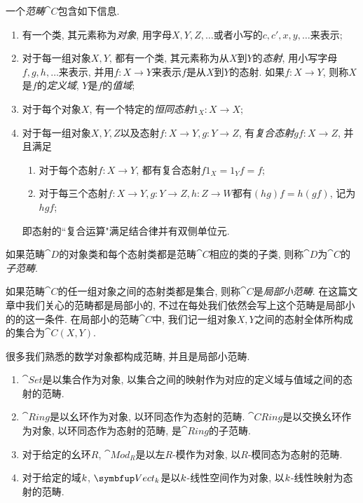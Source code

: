 一个\emph{范畴}$\cat{C}$包含如下信息.
\begin{enumerate}
  \item 有一个类, 其元素称为\emph{对象}, 用字母$X, Y, Z, \dotsc$或者小写的$c, c', x, y, \dotsc$来表示;
  \item 对于每一组对象$X, Y$, 都有一个类, 其元素称为从$X$到$Y$的\emph{态射}, 用小写字母$f, g, h, \dotsc$来表示, 并用$f\colon X\to Y$来表示$f$是从$X$到$Y$的态射. 如果$f\colon X\to Y$, 则称$X$是$f$的\emph{定义域}, $Y$是$f$的\emph{值域};
  \item 对于每个对象$X$, 有一个特定的\emph{恒同态射}$1_X\colon X\to X$;
  \item 对于每一组对象$X, Y, Z$以及态射$f\colon X\to Y, g\colon Y\to Z$, 有\emph{复合态射}$gf\colon X\to Z$, 并且满足
  \begin{enumerate}
    \item 对于每个态射$f\colon X\to Y$, 都有复合态射$f1_{X}=1_{Y}f=f$;
    \item 对于每三个态射$f\colon X\to Y, g\colon Y\to Z, h\colon Z\to W$都有$(hg)f=h(gf)$, 记为$hgf$;
  \end{enumerate}
  即态射的``复合运算"满足结合律并有双侧单位元.
\end{enumerate}

如果范畴$\cat{D}$的对象类和每个态射类都是范畴$\cat{C}$相应的类的子类, 则称$\cat{D}$为$\cat{C}$的\emph{子范畴}.

如果范畴$\cat{C}$的任一组对象之间的态射类都是集合, 则称$\cat{C}$是\emph{局部小范畴}. 在这篇文章中我们关心的范畴都是局部小的, 不过在每处我们依然会写上这个范畴是局部小的的这一条件. 在局部小的范畴$\cat{C}$中, 我们记一组对象$X, Y$之间的态射全体所构成的集合为$\cat{C} (X, Y)$.

\begin{example}
  很多我们熟悉的数学对象都构成范畴, 并且是局部小范畴.
  \begin{enumerate}
    \item $\cat{Set}$是以集合作为对象, 以集合之间的映射作为对应的定义域与值域之间的态射的范畴.
    \item $\cat{Ring}$是以幺环作为对象, 以环同态作为态射的范畴. $\cat{CRing}$是以交换幺环作为对象, 以环同态作为态射的范畴, 是$\cat{Ring}$的子范畴.
    \item 对于给定的幺环$R$, $\cat{Mod}_R$是以左$R$-模作为对象, 以$R$-模同态为态射的范畴.
    \item 对于给定的域$k$, $\cat{Vect}_{\kk}$是以$k$-线性空间作为对象, 以$k$-线性映射为态射的范畴.
  \end{enumerate}
\end{example}


